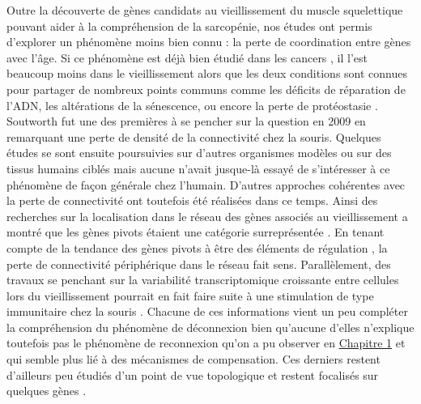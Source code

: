 Outre la découverte de gènes candidats au vieillissement du muscle squelettique pouvant aider à la compréhension de la sarcopénie, nos études ont permis d'explorer un phénomène moins bien connu : la perte de coordination entre gènes avec l'âge. Si ce phénomène est déjà bien étudié dans les cancers \cite{Anglani2014}, il l'est beaucoup moins dans le vieillissement alors que les deux conditions sont connues pour partager de nombreux points communs comme les déficits de réparation de l'ADN, les altérations de la sénescence, ou encore la perte de protéostasie \cite{Hanahan2000Jan}. Soutworth fut une des premières à se pencher sur la question en 2009 \cite{Southworth2009} en remarquant une perte de densité de la connectivité chez la souris. Quelques études se sont ensuite poursuivies sur d'autres organismes modèles \cite{Woo2016May} ou sur des tissus humains ciblés \cite{Bormann2016,Derous2016May} mais aucune n'avait jusque-là essayé de s'intéresser à ce phénomène de façon générale chez l'humain. D'autres approches cohérentes avec la perte de connectivité ont toutefois été réalisées dans ce temps. Ainsi des recherches sur la localisation dans le réseau des gènes associés au vieillissement a montré que les gènes pivots étaient une catégorie surreprésentée \cite{Zhang2016Jul}. En tenant compte de la tendance des gènes pivots à être des éléments de régulation \cite{Jeong2001May}, la perte de connectivité périphérique dans le réseau fait sens. Parallèlement, des travaux se penchant sur la variabilité transcriptomique croissante entre cellules lors du vieillissement pourrait en fait faire suite à une stimulation de type immunitaire chez la souris \cite{Martinez-Jimenez2017Mar}. Chacune de ces informations vient un peu compléter la compréhension du phénomène de déconnexion bien qu'aucune d'elles n'explique toutefois pas le phénomène de reconnexion qu'on a pu observer en \hyperref[chapter:gwena]{Chapitre 1} et qui semble plus lié à des mécanismes de compensation. Ces derniers restent d'ailleurs peu étudiés d'un point de vue topologique et restent focalisés sur quelques gènes \cite{Scheller2018}.



